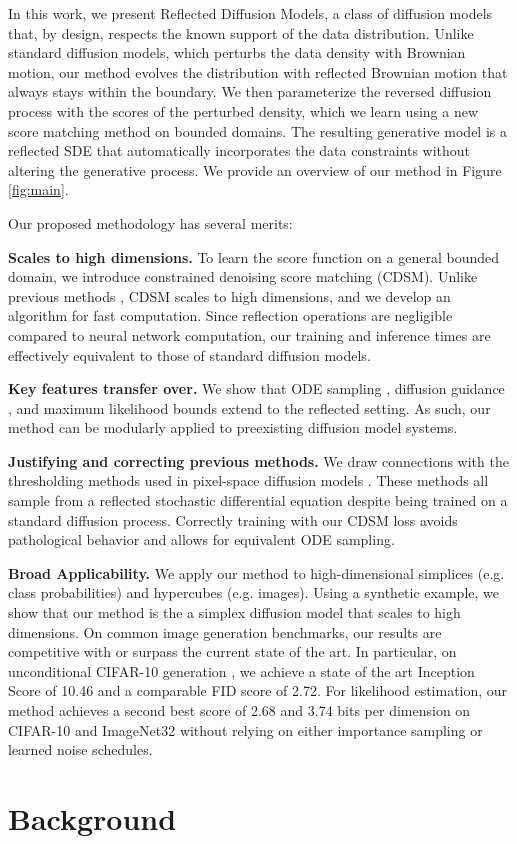 \documentclass{article}
\theoremstyle{plain}
\theoremstyle{definition}
\theoremstyle{remark}
\begin{document}
In this work, we present Reflected Diffusion Models, a class of diffusion models that, by design, respects the known support of the data distribution. Unlike standard diffusion models, which perturbs the data density with Brownian motion, our method evolves the distribution with reflected Brownian motion that always stays within the boundary. We then parameterize the reversed diffusion process with the scores of the perturbed density, which we learn using a new score matching method on bounded domains. The resulting generative model is a reflected SDE that automatically incorporates the data constraints without altering the generative process. We provide an overview of our method in Figure \ref{fig:main}.

Our proposed methodology has several merits:

\textbf{Scales to high dimensions.} To learn the score function on a general bounded domain, we introduce constrained denoising score matching (CDSM). Unlike previous methods \cite{Hyvrinen2007SomeEO}, CDSM scales to high dimensions, and we develop an algorithm for fast computation. Since reflection operations are negligible compared to neural network computation, our training and inference times are effectively equivalent to those of standard diffusion models.

\textbf{Key features transfer over.} We show that ODE sampling \citep{Song2020ScoreBasedGM}, diffusion guidance \citep{Ho2022ClassifierFreeDG}, and maximum likelihood bounds \citep{Song2021MaximumLT} extend to the reflected setting. As such, our method can be modularly applied to preexisting diffusion model systems.

\textbf{Justifying and correcting previous methods.} We draw connections with the thresholding methods used in pixel-space diffusion models \citep{Saharia2022PhotorealisticTD}. These methods all sample from a reflected stochastic differential equation despite being trained on a standard diffusion process. Correctly training with our CDSM loss avoids pathological behavior and allows for equivalent ODE sampling.

\textbf{Broad Applicability.} We apply our method to high-dimensional simplices (e.g. class probabilities) and hypercubes (e.g. images). Using a synthetic example, we show that our method is the a simplex diffusion model that scales to high dimensions. On common image generation benchmarks, our results are competitive with or surpass the current state of the art. In particular, on unconditional CIFAR-10 generation \citep{Krizhevsky2009LearningML}, we achieve a state of the art Inception Score of 10.46 and a comparable FID score of 2.72. For likelihood estimation, our method achieves a second best score of 2.68 and 3.74 bits per dimension on CIFAR-10 and ImageNet32 \citep{Oord2016PixelRN} without relying on either importance sampling or learned noise schedules. \section{Background}
\end{document}
